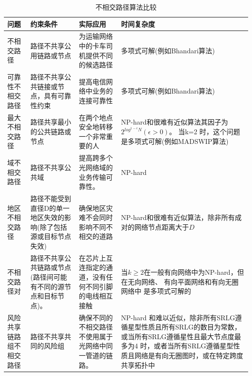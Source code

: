 \begin{table}[htb]
\caption{不相交路径算法比较}\label{tab:disjointPath}
\vspace{0.5em}\centering\wuhao
\begin{tabularx}{46em}{|*{4}{>{\centering\arraybackslash}X|}}
\toprule[1.5pt]
问题   & 约束条件   & 实际应用 & 时间复杂度  \\
\midrule[1pt]
不相交路径 & 路径不共享公用链路或节点 & 为运输网络中的卡车司机提供不同的候选路径 & 多项式可解(例如Bhandari算法\cite{bhandari1997optimal})\\
\hline
可靠性不相交路径 & 路径不共享公共链接或节点，具有可靠性约束 & 提高电信网络中业务的连接可靠性 & 多项式可解(例如Bhandari算法\cite{bhandari1997optimal})\\
\hline
最大不相交路径 & 路径共享最小的公共链路或节点 & 在两个地点安全地转移一个非常重要的人 & NP-hard和很难有近似算法其因子为$2^{log^{1-\epsilon}N}(\epsilon>0)$。 当k=2 时，这个问题是多项式可解(例如MADSWIP算法\cite{taft1999quality})\\
\hline
域不相交路径 & 路径不共享公共域 & 提高跨多个光网络域的业务传输可靠性。 & NP-hard\cite{gao2013domain}\\
\hline
地区不相交路径 & 路径不能受到直径D的单一地区失效的影响(除了包括源或目标节点失效) & 确保地区灾难不会同时影响不同不相交的道路 & NP-hard和很难有近似算法\cite{trajanovski2015finding}，除非所有成对的网络节点距离大于$D$\\
\hline
不相交路径对 & 路径不共享公共链路或节点(路径间可能有不同的源节点和目标节点)。 & 在芯片上互连指定的通道，没有任何不同引脚的电线相互接触 & 当$k\geq2$在一般有向网络中为NP-hard\cite{fortune1980directed}，但在无向网络\cite{robertson1995graph}、 有向平面网络\cite{schrijver1994finding}和有向无圈网络中\cite{fortune1980directed} 是多项式可解的 \\
\hline
风险共享链路组不相交路径 & 路径不共享共同的风险组 & 确保不同的不相交路径不使用属于光网络中同一管道的链路。 & NP-hard\cite{hu2003diverse} 和难以近似\cite{coudert2007shared}，除非所有SRLG遵循星型性质且所有SRLG的数目为常数\cite{bermond2013srlg}，或当所有SRLG遵循星性且最大节点度最多为4\cite{bermond2013srlg} 时，或者当所有SRLG遵循星型性质且网络是有向无圈图\cite{bermond2013srlg}时，或在特定跨度共享拓扑\cite{bhandari1994optimal}中\\
\bottomrule[1.5pt]
\end{tabularx}
\vspace{\baselineskip}
\end{table}
